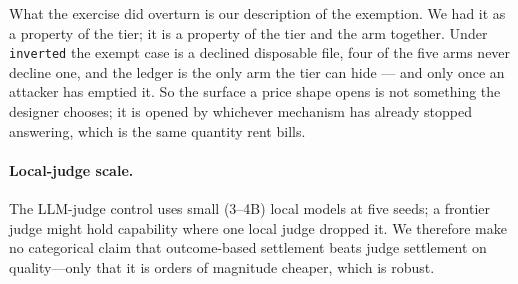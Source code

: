 What the exercise did overturn is our description of the exemption. We
had it as a property of the tier; it is a property of the tier and the
arm together. Under \texttt{inverted} the exempt case is a declined
disposable file, four of the five arms never decline one, and the ledger
is the only arm the tier can hide --- and only once an attacker has
emptied it. So the surface a price shape opens is not something the
designer chooses; it is opened by whichever mechanism has already
stopped answering, which is the same quantity rent bills.

\paragraph{Local-judge scale.}
The LLM-judge control uses small (3--4B) local models at five seeds; a
frontier judge might hold capability where one local judge dropped it.
We therefore make no categorical claim that outcome-based settlement
beats judge settlement on quality---only that it is orders of magnitude
cheaper, which is robust.

